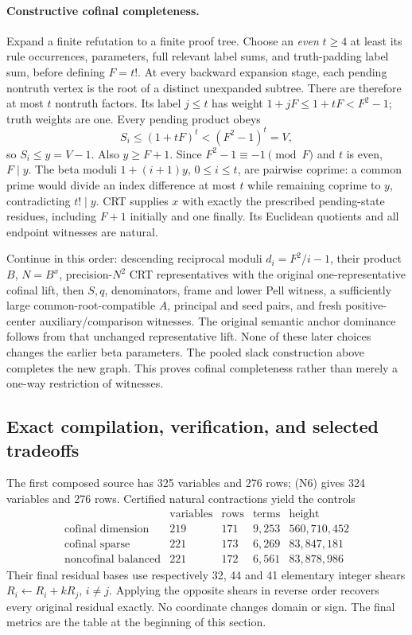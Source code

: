 \paragraph{Constructive cofinal completeness.}
Expand a finite refutation to a finite proof tree.  Choose an \emph{even}
\(t\ge4\) at least its rule occurrences, parameters, full relevant label
sums, and truth-padding label sum, before defining \(F=t!\).
At every backward expansion stage, each pending nontruth vertex is the
root of a distinct unexpanded subtree.  There are therefore at most
\(t\) nontruth factors.  Its label \(j\le t\) has weight
\(1+jF\le1+tF<F^2-1\); truth weights are one.  Every pending product obeys
\[
 S_i\le(1+tF)^t<(F^2-1)^t=V,
\]
so \(S_i\le y=V-1\).  Also \(y\ge F+1\).
Since \(F^2-1\equiv-1\pmod F\) and \(t\) is even, \(F\mid y\).
The beta moduli \(1+(i+1)y\), \(0\le i\le t\), are pairwise coprime:
a common prime would divide an index difference at most \(t\) while
remaining coprime to \(y\), contradicting \(t!\mid y\).
CRT supplies \(x\) with exactly the prescribed pending-state residues,
including \(F+1\) initially and one finally.  Its Euclidean quotients and
all endpoint witnesses are natural.

Continue in this order: descending reciprocal moduli
\(d_i=F^2/i-1\), their product \(B\), \(N=B^x\), precision-\(N^2\)
CRT representatives with the original one-representative cofinal lift,
then \(S,q\), denominators, frame and lower Pell witness, a sufficiently
large common-root-compatible \(A\), principal and seed pairs, and fresh
positive-center auxiliary/comparison witnesses.  The original semantic
anchor dominance follows from that unchanged representative lift.
None of these later choices changes the earlier beta parameters.
The pooled slack construction above completes the new graph.  This proves
cofinal completeness rather than merely a one-way restriction of witnesses.

\subsection{Exact compilation, verification, and selected tradeoffs}

The first composed source has 325 variables and 276 rows; (N6) gives 324
variables and 276 rows.  Certified natural contractions yield the controls
\[
\begin{array}{c|rrrr}
 &\text{variables}&\text{rows}&\text{terms}&\text{height}\\\hline
\text{cofinal dimension}&219&171&9,253&560,710,452\\
\text{cofinal sparse}&221&173&6,269&83,847,181\\
\text{noncofinal balanced}&221&172&6,561&83,878,986
\end{array}
\]
Their final residual bases use respectively 32, 44 and 41 elementary
integer shears \(R_i\leftarrow R_i+kR_j\), \(i\ne j\).
Applying the opposite shears in reverse order recovers every original
residual exactly.  No coordinate changes domain or sign.  The final
metrics are the table at the beginning of this section.

